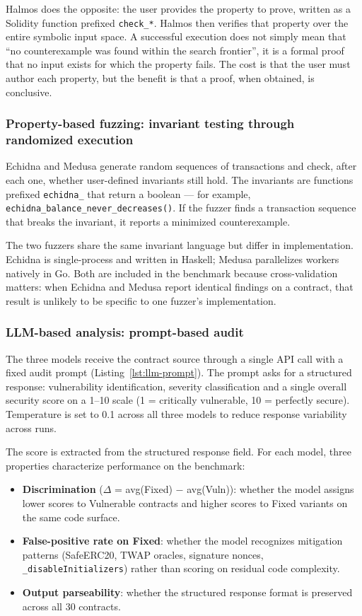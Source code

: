 Halmos does the opposite: the user provides the property to prove, written as a Solidity function prefixed \texttt{check\_*}. Halmos then verifies that property over the entire symbolic input space. A successful execution does not simply mean that ``no counterexample was found within the search frontier'', it is a formal proof that no input exists for which the property fails. The cost is that the user must author each property, but the benefit is that a proof, when obtained, is conclusive.

\subsubsection{Property-based fuzzing: invariant testing through randomized execution}

Echidna and Medusa generate random sequences of transactions and check, after each one, whether user-defined invariants still hold. The invariants are functions prefixed \texttt{echidna\_} that return a boolean — for example, \texttt{echidna\_balance\_never\_decreases()}. If the fuzzer finds a transaction sequence that breaks the invariant, it reports a minimized counterexample.

The two fuzzers share the same invariant language but differ in implementation. Echidna is single-process and written in Haskell; Medusa parallelizes workers natively in Go. Both are included in the benchmark because cross-validation matters: when Echidna and Medusa report identical findings on a contract, that result is unlikely to be specific to one fuzzer's implementation.

\subsubsection{LLM-based analysis: prompt-based audit}

The three models receive the contract source through a single API call with a fixed audit prompt (Listing~\ref{lst:llm-prompt}). The prompt asks for a structured response: vulnerability identification, severity classification and a single overall security score on a 1–10 scale (1 = critically vulnerable, 10 = perfectly secure). Temperature is set to 0.1 across all three models to reduce response variability across runs.

The score is extracted from the structured response field. For each model, three properties characterize performance on the benchmark:

\begin{itemize}
  \item \textbf{Discrimination} ($\Delta$ = avg(Fixed) $-$ avg(Vuln)): whether the model assigns lower scores to Vulnerable contracts and higher scores to Fixed variants on the same code surface.
  \item \textbf{False-positive rate on Fixed}: whether the model recognizes mitigation patterns (SafeERC20, TWAP oracles, signature nonces, \texttt{\_disableInitializers}) rather than scoring on residual code complexity.
  \item \textbf{Output parseability}: whether the structured response format is preserved across all 30 contracts.
\end{itemize}

